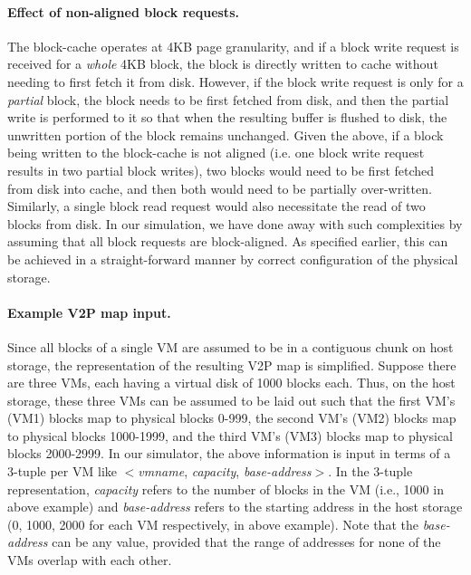 \paragraph{Effect of non-aligned block requests.}
The block-cache operates at 4KB page granularity, and if a block write
request is received for a \textit{whole} 4KB block, the block is directly 
written to cache without needing to first fetch it from disk. However,
if the block write request is only for a \textit{partial} block, the 
block needs to be first fetched from disk, and then the partial write
is performed to it so that when the resulting buffer is flushed to disk,
the unwritten portion of the block remains unchanged.
Given the above, if a block being written to the block-cache is not 
aligned (i.e. one block write request results in two partial block writes), 
two blocks would need to be first fetched from disk into cache, and 
then both would need to be partially over-written. 
Similarly, a single block read request would also necessitate the read of two
blocks from disk.
In our simulation, we have done away with such complexities by assuming 
that all block requests are block-aligned. As specified earlier, this can be
achieved in a straight-forward manner by correct configuration of
the physical storage.


\paragraph{Example V2P map input.}
Since all blocks of a single VM are assumed to be in a contiguous chunk on
host storage, the representation of the resulting V2P map is simplified.
Suppose there are three VMs, each having a virtual disk of 1000 blocks each.
Thus, on the host storage, these three VMs can be assumed to be laid out
such that the first VM's (VM1) blocks map to physical blocks 0-999, 
the second VM's (VM2) blocks map to physical blocks 1000-1999, and the
third VM's (VM3) blocks map to physical blocks 2000-2999. 
In our simulator, the above information is input in terms 
of a 3-tuple per VM like 
$<$\textit{vmname}, \textit{capacity}, \textit{base-address}$>$.
In the 3-tuple representation, \textit{capacity} refers to the number of
blocks in the VM (i.e., 1000 in above example) and \textit{base-address}
refers to the starting address in the host storage (0, 1000, 2000 
for each VM respectively, in above example). 
Note that the \textit{base-address} can be any value, provided that the
range of addresses for none of the VMs overlap with each other.

